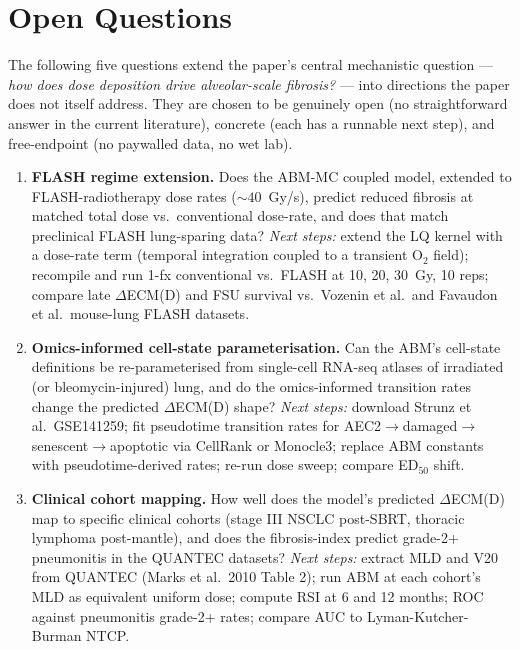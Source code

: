 \section{Open Questions}

The following five questions extend the paper's central mechanistic
question --- \emph{how does dose deposition drive alveolar-scale
fibrosis?} --- into directions the paper does not itself address.
They are chosen to be genuinely open (no straightforward answer in
the current literature), concrete (each has a runnable next step),
and free-endpoint (no paywalled data, no wet lab).

\begin{enumerate}
  \item \textbf{FLASH regime extension.} Does the ABM-MC coupled model,
    extended to FLASH-radiotherapy dose rates ($\sim 40$~Gy/s), predict
    reduced fibrosis at matched total dose vs.\ conventional dose-rate,
    and does that match preclinical FLASH lung-sparing data?
    \emph{Next steps:} extend the LQ kernel with a dose-rate term
    (temporal integration coupled to a transient O$_2$ field);
    recompile and run 1-fx conventional vs.\ FLASH at 10, 20, 30~Gy,
    10 reps; compare late $\Delta$ECM(D) and FSU survival vs.\ Vozenin
    et al.\ and Favaudon et al.\ mouse-lung FLASH datasets.

  \item \textbf{Omics-informed cell-state parameterisation.} Can the
    ABM's cell-state definitions be re-parameterised from single-cell
    RNA-seq atlases of irradiated (or bleomycin-injured) lung, and do
    the omics-informed transition rates change the predicted
    $\Delta$ECM(D) shape?
    \emph{Next steps:} download Strunz et al.\ GSE141259; fit pseudotime
    transition rates for AEC2$\rightarrow$damaged$\rightarrow$
    senescent$\rightarrow$apoptotic via CellRank or Monocle3; replace
    ABM constants with pseudotime-derived rates; re-run dose sweep;
    compare ED$_{50}$ shift.

  \item \textbf{Clinical cohort mapping.} How well does the model's
    predicted $\Delta$ECM(D) map to specific clinical cohorts (stage III
    NSCLC post-SBRT, thoracic lymphoma post-mantle), and does the
    fibrosis-index predict grade-2+ pneumonitis in the QUANTEC
    datasets?
    \emph{Next steps:} extract MLD and V20 from QUANTEC (Marks et al.\
    2010 Table 2); run ABM at each cohort's MLD as equivalent uniform
    dose; compute RSI at 6 and 12 months; ROC against pneumonitis
    grade-2+ rates; compare AUC to Lyman-Kutcher-Burman NTCP.


\end{enumerate}
